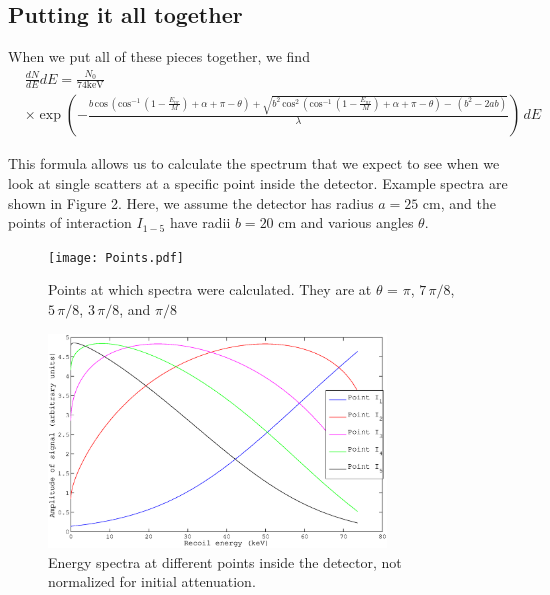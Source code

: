 \documentclass{article}
\begin{document}
\subsection{Putting it all together}
When we put all of these pieces together, we find
\begin{align*}
&\frac{dN}{dE} dE = \frac{N_0}{74 \text{keV}} \, \, \\
& \times \exp \left( - \frac{ b \, \text{cos} \, (\text{cos}^{-1} \, \left( 1 - \frac{E_{nr}}{M} \right) + \alpha + \pi - \theta) + \sqrt{  b^2 \, \text{cos}^2 \,(\text{cos}^{-1} \, \left( 1 - \frac{E_{nr}}{M} \right) + \alpha + \pi - \theta)  - \, (b^2 - 2 ab)  }  } {\lambda } \right)  \, dE
 \end{align*}
 
 
This formula allows us to calculate the spectrum that we expect to see when we look at single scatters at a specific point inside the detector.  Example spectra are shown in Figure 2. Here, we assume the detector has radius $a = 25$ cm, and the points of interaction $I_{1-5}$ have radii $b = 20$ cm and various angles $\theta$. 
\begin{figure}
\texttt{[image: Points.pdf]}
\centering
\caption{Points at which spectra were calculated. They are at $\theta$ = $\pi$, $7 \, \pi / 8$, $5 \, \pi / 8$, $3 \, \pi / 8$, and $\pi / 8$ }
\end{figure}

\begin{figure}
\includegraphics[width=0.8\textwidth]{SpectraAtDifferentAngles.eps}
\centering
\caption{Energy spectra at different points inside the detector, not normalized for initial attenuation.}

\end{figure}




\end{document}
